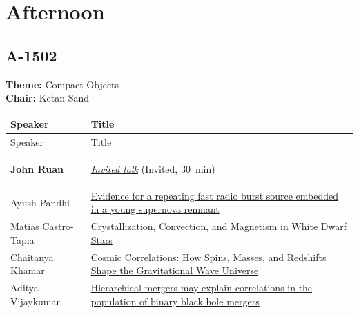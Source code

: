 \hypertarget{schedule-wednesday-afternoon}{}
\section*{Afternoon}

\hypertarget{schedule-wednesday-afternoon-a-1502}{}
\subsection*{A-1502}
\textbf{Theme:} Compact Objects\\
\textbf{Chair:} Ketan Sand\\
{\small
{}
\sloppy
\setlength{\emergencystretch}{1em}
\begin{longtable}{@{}>{\TableRaggedRight\arraybackslash\hspace{0pt}}p{} >{\TableRaggedRight\arraybackslash\hspace{0pt}}p{}@{}}
\toprule
Speaker & Title \\
\midrule
\endfirsthead
\toprule
Speaker & Title \\
\midrule
\endhead
\hypertarget{invited-john-ruan-sched}{}\label{invited-page-john-ruan-sched}{\bfseries\color{cascagold}John Ruan} & \hyperlink{invited-john-ruan}{\emph{Invited talk}} {\small\color{cascagold}(Invited, 30~min)} \\
\hypertarget{schedule-talk-52}{}\label{schedule-page-talk-52}Ayush Pandhi & \hyperlink{abstract-talk-52}{Evidence for a repeating fast radio burst source embedded in a young supernova remnant} \\
\hypertarget{schedule-talk-137}{}\label{schedule-page-talk-137}Matias Castro-Tapia & \hyperlink{abstract-talk-137}{Crystallization, Convection, and Magnetism in White Dwarf Stars} \\
\hypertarget{schedule-talk-307}{}\label{schedule-page-talk-307}Chaitanya Khamar & \hyperlink{abstract-talk-307}{Cosmic Correlations: How Spins, Masses, and Redshifts Shape the Gravitational Wave Universe} \\
\hypertarget{schedule-talk-262}{}\label{schedule-page-talk-262}Aditya Vijaykumar & \hyperlink{abstract-talk-262}{Hierarchical mergers may explain correlations in the population of binary black hole mergers} \\
\bottomrule
\end{longtable}
}

\hypertarget{schedule-wednesday-afternoon-a-4502}{}
